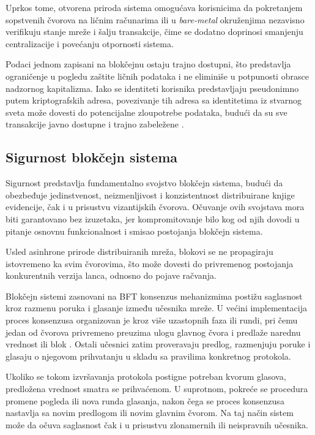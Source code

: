 Uprkos tome, otvorena priroda sistema omogućava korisnicima da pokretanjem sopstvenih čvorova na ličnim računarima ili u \textit{bare-metal} okruženjima nezavisno verifikuju stanje mreže i šalju transakcije, čime se dodatno doprinosi smanjenju centralizacije i povećanju otpornosti sistema.

Podaci jednom zapisani na blokčejnu ostaju trajno dostupni, što predstavlja ograničenje u pogledu zaštite ličnih podataka i ne eliminiše u potpunosti obrasce nadzornog kapitalizma. Iako se identiteti korisnika predstavljaju pseudonimno putem kriptografskih adresa, povezivanje tih adresa sa identitetima iz stvarnog sveta može dovesti do potencijalne zloupotrebe podataka, budući da su sve transakcije javno dostupne i trajno zabeležene \cite{peng2021privacy}.

\subsection{Sigurnost blokčejn sistema}
Sigurnost predstavlja fundamentalno svojstvo blokčejn sistema, budući da obezbeđuje jedinstvenost, neizmenljivost i konzistentnost distribuirane knjige evidencije, čak i u prisustvu vizantijskih čvorova. Očuvanje ovih svojstava mora biti garantovano bez izuzetaka, jer kompromitovanje bilo kog od njih dovodi u pitanje osnovnu funkcionalnost i smisao postojanja blokčejn sistema.

Usled asinhrone prirode distribuiranih mreža, blokovi se ne propagiraju istovremeno ka svim čvorovima, što može dovesti do privremenog postojanja konkurentnih verzija lanca, odnosno do pojave račvanja.

Blokčejn sistemi zasnovani na BFT konsenzus mehanizmima postižu saglasnost kroz razmenu poruka i glasanje između učesnika mreže. U većini implementacija proces konsenzusa organizovan je kroz više uzastopnih faza ili rundi, pri čemu jedan od čvorova privremeno preuzima ulogu glavnog čvora i predlaže narednu vrednost ili blok \cite{buchman2016tendermint}. Ostali učesnici zatim proveravaju predlog, razmenjuju poruke i glasaju o njegovom prihvatanju u skladu sa pravilima konkretnog protokola.

Ukoliko se tokom izvršavanja protokola postigne potreban kvorum glasova, predložena vrednost smatra se prihvaćenom. U suprotnom, pokreće se procedura promene pogleda  ili nova runda glasanja, nakon čega se proces konsenzusa nastavlja sa novim predlogom ili novim glavnim čvorom. Na taj način sistem može da očuva saglasnost čak i u prisustvu zlonamernih ili neispravnih učesnika.


